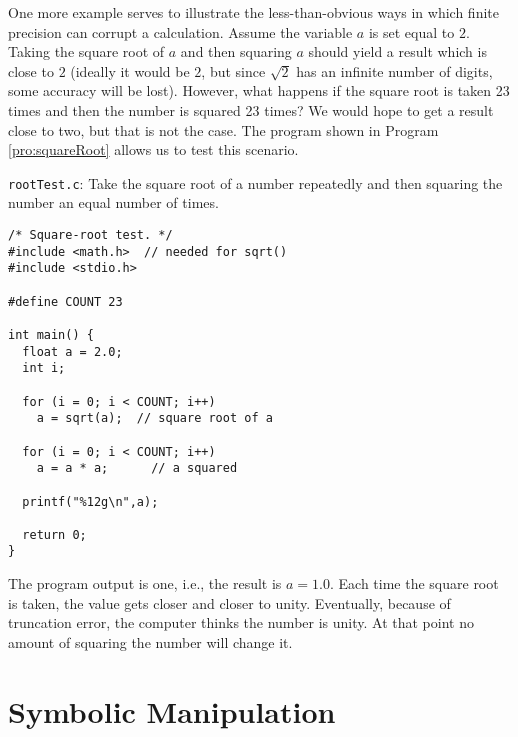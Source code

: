 One more example serves to illustrate the less-than-obvious ways in
which finite precision can corrupt a calculation.  Assume the variable
$a$ is set equal to $2$.  Taking the square root of $a$ and then
squaring $a$ should yield a result which is close to $2$ (ideally it
would be $2$, but since $\sqrt{2}$ has an infinite number of digits,
some accuracy will be lost).  However, what happens if the square root
is taken 23 times and then the number is squared 23 times?  We would
hope to get a result close to two, but that is not the case.
The program shown in Program \ref{pro:squareRoot} allows us to test
this scenario.
\begin{program}
{\tt rootTest.c}: 
Take the square root of a number repeatedly
and then squaring the number an equal number of
times. \label{pro:squareRoot}
\codemiddle
\begin{lstlisting}
/* Square-root test. */
#include <math.h>  // needed for sqrt()
#include <stdio.h>

#define COUNT 23

int main() {
  float a = 2.0;
  int i;

  for (i = 0; i < COUNT; i++)
    a = sqrt(a);  // square root of a

  for (i = 0; i < COUNT; i++)
    a = a * a;      // a squared

  printf("%12g\n",a);

  return 0;
}
\end{lstlisting}
\end{program}
The program output is one, i.e., the result is $a=1.0$.  Each time the
square root is taken, the value gets closer and closer to unity.
Eventually, because of truncation error, the computer thinks the
number is unity.  At that point no amount of squaring the number will
change it.

\section{Symbolic Manipulation}

